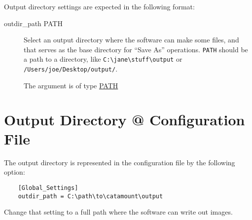 Output directory settings are expected in the following format:

\begin{description}

\item[outdir\_path PATH]
\hypertarget{global-outdir-path}{}

Select an output directory where the software can make some files, and
that serves as the base directory for ``Save As'' operations.
\texttt{PATH} should be a path to a directory, like
\texttt{C:\textbackslash{}jane\textbackslash{}stuff\textbackslash{}output}
or \texttt{/Users/joe/Desktop/output/}.

The argument is of type \hyperlink{argument-type-path}{PATH}

\end{description}


\section{Output Directory @ Configuration File}

The output directory is represented in the configuration file by the
following option:

\begin{verbatim}
    [Global_Settings]
    outdir_path = C:\path\to\catamount\output
\end{verbatim}

Change that setting to a full path where the software can write out
images.
